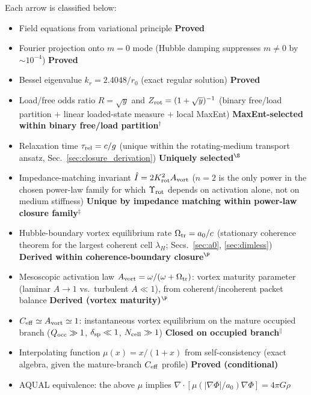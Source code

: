 \documentclass[11pt]{article}
\begin{document}
Each arrow is classified below:
\begin{itemize}
\item[$\to$] Field equations from variational principle
  \hfill\textbf{Proved}
\item[$\to$] Fourier projection onto $m=0$ mode
  (Hubble damping suppresses $m\neq0$ by $\sim10^{-4}$)
  \hfill\textbf{Proved}
\item[$\to$] Bessel eigenvalue $k_r=2.4048/r_0$
  (exact regular solution)
  \hfill\textbf{Proved}
\item[$\to$] Load/free odds ratio $R=\sqrt{y}$ and
  $Z_{\rm rot}=(1+\sqrt{y})^{-1}$
  (binary free/load partition $+$ linear loaded-state measure
  $+$ local MaxEnt)
  \hfill\textbf{MaxEnt-selected within binary free/load partition}${}^{\dagger}$
\item[$\to$] Relaxation time $\tau_{\rm rel}=c/g$
  (unique within the rotating-medium transport ansatz,
  Sec.~\ref{sec:closure_derivation})
  \hfill\textbf{Uniquely selected}${}^{\S}$
\item[$\to$] Impedance-matching invariant $\hat I=2K_{\rm rot}^2A_{\rm vort}$
  ($n=2$ is the only power in the chosen power-law family
  for which $\Upsilon_{\rm rot}$ depends on activation alone,
  not on medium stiffness)
  \hfill\textbf{Unique by impedance matching within power-law closure family}${}^{\ddagger}$
\item[$\to$] Hubble-boundary vortex equilibrium rate $\Omega_{\rm tr}=a_0/c$
  (stationary coherence theorem for the largest coherent cell
  $\lambda_H$; Secs.~\ref{sec:a0}, \ref{sec:dimless})
  \hfill\textbf{Derived within coherence-boundary closure}${}^{\P}$
\item[$\to$] Mesoscopic activation law
  $A_{\rm vort}=\omega/(\omega+\Omega_{\rm tr})$:
  vortex maturity parameter (laminar $A\!\to\!1$
  vs.\ turbulent $A\!\ll\!1$), from coherent/incoherent
  packet balance
  \hfill\textbf{Derived (vortex maturity)}${}^{\P}$
\item[$\to$] $C_{\rm eff}\simeq A_{\rm vort}\simeq1$: instantaneous vortex equilibrium
  on the mature occupied branch
  ($Q_{\rm occ}\gg1$, $\delta_{\rm sp}\ll1$, $N_{\rm cell}\gg1$)
  \hfill\textbf{Closed on occupied branch}${}^{\parallel}$
\item[$\to$] Interpolating function $\mu(x)=x/(1+x)$
  from self-consistency (exact algebra, given the mature-branch
  $C_{\rm eff}$ profile)
  \hfill\textbf{Proved (conditional)}
\item[$\to$] AQUAL equivalence: the above $\mu$ implies
  $\nabla\!\cdot\![\mu(|\nabla\Phi|/a_0)\nabla\Phi]=4\pi G\rho$

\end{itemize}
\end{document}
